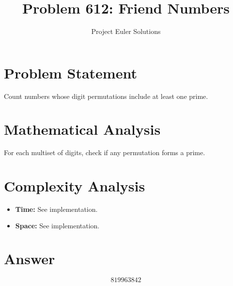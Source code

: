 \documentclass[11pt]{article}
\title{Problem 612: Friend Numbers}
\author{Project Euler Solutions}
\date{}
\begin{document}
\maketitle

\section{Problem Statement}
Count numbers whose digit permutations include at least one prime.

\section{Mathematical Analysis}
For each multiset of digits, check if any permutation forms a prime.

\section{Complexity Analysis}
\begin{itemize}
    \item \textbf{Time:} See implementation.
    \item \textbf{Space:} See implementation.
\end{itemize}

\section{Answer}

\[
\boxed{819963842}
\]
\end{document}
